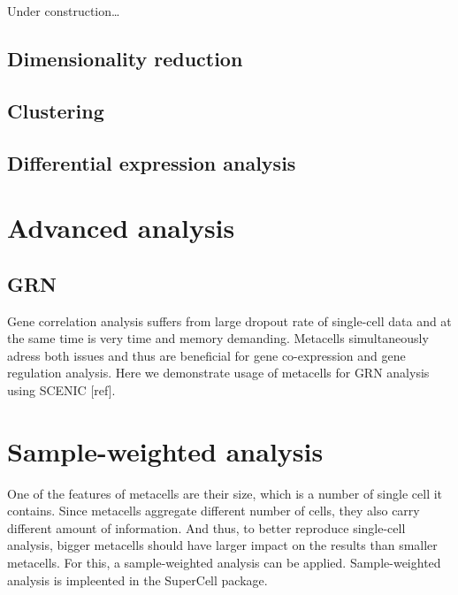 \documentclass[
]{book}
\begin{document}
Under construction\ldots{}

\hypertarget{dimensionality-reduction-1}{%
\subsection{Dimensionality reduction}\label{dimensionality-reduction-1}}

\hypertarget{clustering-1}{%
\subsection{Clustering}\label{clustering-1}}

\hypertarget{differential-expression-analysis-1}{%
\subsection{Differential expression analysis}\label{differential-expression-analysis-1}}

\hypertarget{advanced-analysis}{%
\section{Advanced analysis}\label{advanced-analysis}}

\hypertarget{grn}{%
\subsection{GRN}\label{grn}}

Gene correlation analysis suffers from large dropout rate of single-cell data and at the same time is very time and memory demanding. Metacells simultaneously adress both issues and thus are beneficial for gene co-expression and gene regulation analysis. Here we demonstrate usage of metacells for GRN analysis using SCENIC {[}ref{]}.

\hypertarget{weighted-analysis}{%
\section{Sample-weighted analysis}\label{weighted-analysis}}

One of the features of metacells are their size, which is a number of single cell it contains. Since metacells aggregate different number of cells, they also carry different amount of information. And thus, to better reproduce single-cell analysis, bigger metacells should have larger impact on the results than smaller metacells. For this, a sample-weighted analysis can be applied. Sample-weighted analysis is impleented in the SuperCell package.
\end{document}
